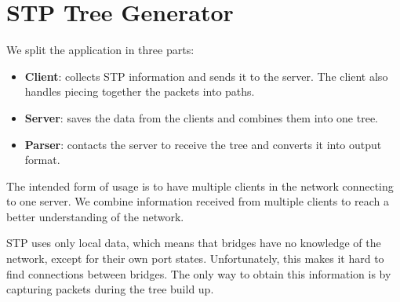 \chapter{STP Tree Generator}
\label{stp-gen}
We split the application in three parts:
\begin{itemize}
    \item \textbf{Client}: collects STP information and sends it to the server.
        The client also handles piecing together the packets into paths.
    \item \textbf{Server}: saves the data from the clients and combines them into one tree.
    \item \textbf{Parser}: contacts the server to receive the tree and converts it into output format.
\end{itemize}
The intended form of usage is to have multiple clients in the network connecting to one server.
We combine information received from multiple clients to reach a better understanding of the network.

STP uses only local data, which means that bridges have no knowledge of the network, except for their own port states.
Unfortunately, this makes it hard to find connections between bridges.
The only way to obtain this information is by capturing packets during the tree build up.

